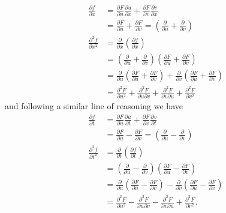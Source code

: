 \begin{solution}
    \begin{align*}
        \frac{\partial f}{\partial x} &= \frac{\partial F}{\partial u} \frac{\partial u}{\partial x} + \frac{\partial F}{\partial v} \frac{\partial v}{\partial x} \\
        &= \frac{\partial F}{\partial u} + \frac{\partial F}{\partial v} = \left( \frac{\partial}{\partial u} + \frac{\partial}{\partial v} \right) \\
        \frac{\partial^2 f}{\partial x^2} &= \frac{\partial}{\partial x} \left( \frac{\partial f}{\partial x} \right) \\
        &= \left( \frac{\partial}{\partial u} + \frac{\partial}{\partial v} \right) \left( \frac{\partial F}{\partial u} + \frac{\partial F}{\partial v} \right) \\
        &= \frac{\partial}{\partial u} \left( \frac{\partial F}{\partial u} + \frac{\partial F}{\partial v} \right) + \frac{\partial}{\partial v} \left( \frac{\partial F}{\partial u} + \frac{\partial F}{\partial v} \right) \\
        &= \frac{\partial^2 F}{\partial u^2} + \frac{\partial^2 F}{\partial u \partial v} + \frac{\partial^2 F}{\partial v \partial u} + \frac{\partial^2 F}{\partial v^2} 
    \end{align*}
    and following a similar line of reasoning we have
    \begin{align*}
        \frac{\partial f}{\partial t} &= \frac{\partial F}{\partial u} \frac{\partial u}{\partial t} + \frac{\partial F}{\partial v} \frac{\partial v}{\partial t} \\
        &= \frac{\partial F}{\partial u} - \frac{\partial F}{\partial v} = \left( \frac{\partial}{\partial u} - \frac{\partial}{\partial v} \right) \\
        \frac{\partial^2 f}{\partial t^2} &= \frac{\partial}{\partial t} \left( \frac{\partial f}{\partial t} \right) \\
        &= \left( \frac{\partial}{\partial u} - \frac{\partial}{\partial v} \right) \left( \frac{\partial F}{\partial u} - \frac{\partial F}{\partial v} \right) \\
        &= \frac{\partial}{\partial u} \left( \frac{\partial F}{\partial u} - \frac{\partial F}{\partial v} \right) - \frac{\partial}{\partial v} \left( \frac{\partial F}{\partial u} - \frac{\partial F}{\partial v} \right) \\
        &= \frac{\partial^2 F}{\partial u^2} - \frac{\partial^2 F}{\partial u \partial v} - \frac{\partial^2 F}{\partial v \partial u} + \frac{\partial^2 F}{\partial v^2}.

\end{align*}
\end{solution}
